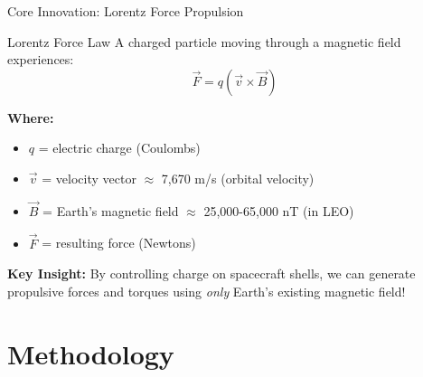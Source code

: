\documentclass[aspectratio=169]{beamer}
\begin{document}
\begin{frame}{Core Innovation: Lorentz Force Propulsion}
\begin{block}{Lorentz Force Law}
A charged particle moving through a magnetic field experiences:
\begin{equation}
\vec{F} = q(\vec{v} \times \vec{B})
\end{equation}
\end{block}

\textbf{Where:}
\begin{itemize}
    \item $q$ = electric charge (Coulombs)
    \item $\vec{v}$ = velocity vector $\approx$ 7,670 m/s (orbital velocity)
    \item $\vec{B}$ = Earth's magnetic field $\approx$ 25,000-65,000 nT (in LEO)
    \item $\vec{F}$ = resulting force (Newtons)
\end{itemize}

\vspace{1em}
\textbf{Key Insight:}
By controlling charge on spacecraft shells, we can generate propulsive forces and torques using \textit{only} Earth's existing magnetic field!
\end{frame}

\section{Methodology}
\end{document}
